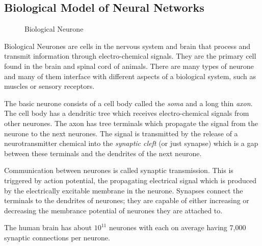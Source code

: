 \documentclass{acm_proc_article-sp}
\begin{document}
\subsection{Biological Model of Neural Networks}
{
\begin{figure}[t]
\centering
{}
\caption{Biological Neurone}
\label{fig:neurone:biological}
\end{figure}

Biological Neurones are cells in the nervous system and brain that process and transmit information through electro{}-chemical signals. They are the primary cell found in the brain and spinal cord of animals. There are many types of neurone and many of them interface with different aspects of a biological system, such as muscles or sensory receptors.

The basic neurone consists of a cell body called the {\textit{soma}} and a long thin {\textit{axon}}. The cell body has a dendritic tree which receives electro{}-chemical signals from other neurones. The axon has tree terminals which propagate the signal from the neurone to the next neurones. The signal is transmitted by the release of a neurotransmitter chemical into the {\textit{synaptic cleft}} (or just synapse) which is a gap between these terminals and the dendrites of the next neurone.

Communication between neurones is called synaptic transmission. This is triggered by action potential, the propagating electrical signal which is produced by the electrically excitable membrane in the neurone. Synapses connect the terminals to the dendrites of neurones; they are capable of either increasing or decreasing the membrance potential of neurones they are attached to.

The human brain has about $10^{11}$ neurones with each on average having 7,000 synaptic connections per neurone\cite{bioneurones}.
}
\end{document}
